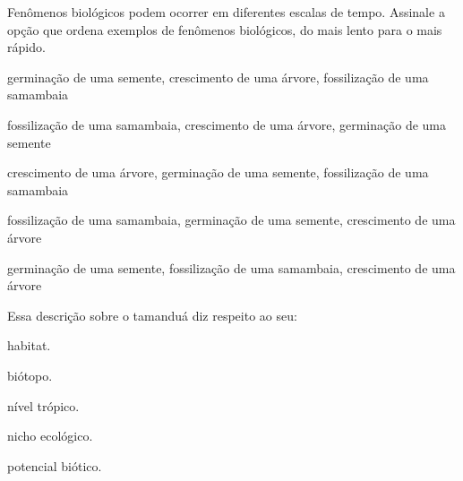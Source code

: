 \questao
Fenômenos biológicos podem ocorrer em diferentes escalas de tempo. Assinale a opção que ordena exemplos de fenômenos biológicos, do mais lento para o mais rápido.
\begin{alternativas}
\item germinação de uma semente, crescimento de uma árvore, fossilização de uma samambaia 
\item fossilização de uma samambaia, crescimento de uma árvore, germinação de uma semente 
\item crescimento de uma árvore, germinação de uma semente, fossilização de uma samambaia 
\item fossilização de uma samambaia, germinação de uma semente, crescimento de uma árvore
\item germinação de uma semente, fossilização de uma samambaia, crescimento de uma árvore
\end{alternativas}

\questao
{}
Essa descrição sobre o tamanduá diz respeito ao seu:
\begin{alternativas}
\item habitat. 
\item biótopo. 
\item nível trópico. 
\item nicho ecológico. 
\item potencial biótico.
\end{alternativas}

%
%

